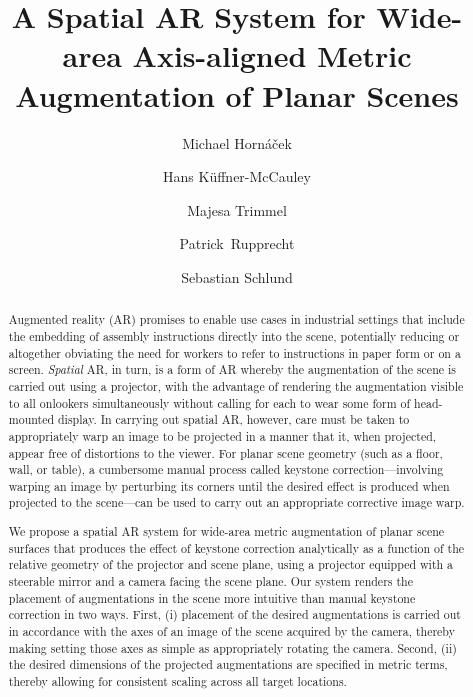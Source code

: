 \documentclass[review]{elsarticle}
\begin{document}
\begin{frontmatter}

\title{A Spatial AR System for Wide-area Axis-aligned Metric Augmentation of Planar Scenes} %

\author{Michael Horn\'{a}\v{c}ek}
\author{Hans K\"{u}ffner-McCauley}
\author{Majesa Trimmel}
\author{Patrick~Rupprecht}
\author{Sebastian Schlund}
\address{Human Centered Cyber Physical Production and Assembly Systems, Institute for Management Sciences, TU Wien, Vienna, Austria}

\begin{abstract}
Augmented reality (AR) promises to enable use cases in industrial settings that include the embedding of assembly instructions directly into the scene, potentially reducing or altogether obviating the need for workers to refer to instructions in paper form or on a screen. \textit{Spatial} AR, in turn, is a form of AR whereby the augmentation of the scene is carried out using a projector, with the advantage of rendering the augmentation visible to all onlookers simultaneously without calling for each to wear some form of head-mounted display. In carrying out spatial AR, however, care must be taken to appropriately warp an image to be projected in a manner that it, when projected, appear free of distortions to the viewer. For planar scene geometry (such as a floor, wall, or table), a cumbersome manual process called keystone correction---involving warping an image by perturbing its corners until the desired effect is produced when projected to the scene---can be used to carry out an appropriate corrective image warp. %

We propose a spatial AR system for wide-area metric augmentation of planar scene surfaces that produces the effect of keystone correction analytically as a function of the relative geometry of the projector and scene plane, using a projector equipped with a steerable mirror and a camera facing the scene plane. Our system renders the placement of augmentations in the scene more intuitive than manual keystone correction in two ways. First, (i) placement of the desired augmentations is carried out in accordance with the axes of an image of the scene acquired by the camera, thereby making setting those axes as simple as appropriately rotating the camera. Second, (ii) the desired dimensions of the projected augmentations are specified in metric terms, thereby allowing for consistent scaling across all target locations. %
\end{abstract}


\end{frontmatter}
\end{document}
